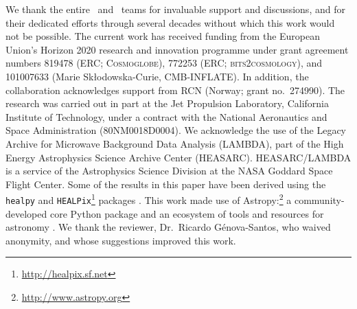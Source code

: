 \begin{acknowledgements}
  We thank the entire \Planck\ and \WMAP\ teams for invaluable support
  and discussions, and for their dedicated efforts through several
  decades without which this work would not be possible. The current
  work has received funding from the European Union’s Horizon 2020
  research and innovation programme under grant agreement numbers
  819478 (ERC; \textsc{Cosmoglobe}), 772253 (ERC;
  \textsc{bits2cosmology}), and 101007633 (Marie Skłodowska-Curie,
  \textsc{CMB-INFLATE}). In addition, the collaboration acknowledges
  support from RCN (Norway; grant no.\ 274990). The research was
  carried out in part at the Jet Propulsion Laboratory, California
  Institute of Technology, under a contract with the National
  Aeronautics and Space Administration (80NM0018D0004).  We
  acknowledge the use of the Legacy Archive for Microwave Background
  Data Analysis (LAMBDA), part of the High Energy Astrophysics Science
  Archive Center (HEASARC). HEASARC/LAMBDA is a service of the
  Astrophysics Science Division at the NASA Goddard Space Flight
  Center.  Some of the results in this paper have been derived using
  the \texttt{healpy} and
  \texttt{HEALPix}\footnote{\url{http://healpix.sf.net}} packages
  \citep{gorski2005, Zonca2019}.  This work made use of
  Astropy:\footnote{\url{http://www.astropy.org}} a
  community-developed core Python package and an ecosystem of tools
  and resources for astronomy \citep{astropy:2013, astropy:2018,
    astropy:2022}.
  We thank the reviewer, Dr.~Ricardo Génova-Santos, who waived anonymity, and whose suggestions improved this work.
\end{acknowledgements}
